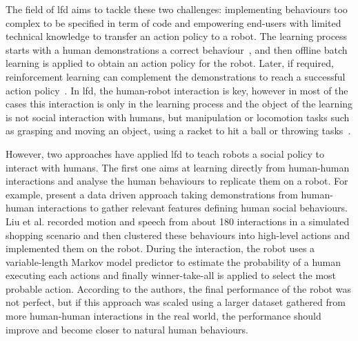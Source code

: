 	    
	The field of \gls{lfd} aims to tackle these two challenges: implementing behaviours too complex to be specified in term of code and empowering end-users with limited technical knowledge to transfer an action policy to a robot. The learning process starts with a human demonstrations a correct behaviour~\citep{argall2009survey}, and then offline batch learning is applied to obtain an action policy for the robot. Later, if required, reinforcement learning can complement the demonstrations to reach a successful action policy~\citep{billard2008robot}.
	In \gls{lfd}, the human-robot interaction is key, however in most of the cases this interaction is only in the learning process and the object of the learning is not social interaction with humans, but manipulation or locomotion tasks such as grasping and moving an object, using a racket to hit a ball or throwing tasks~\citep{billard2008robot}.
	
	However, two approaches have applied \gls{lfd} to teach robots a social policy to interact with humans.	The first one aims at learning directly from human-human interactions and analyse the human behaviours to replicate them on a robot. For example, \citet{liu2014train} present a data driven approach taking demonstrations from human-human interactions to gather relevant features defining human social behaviours. Liu et al. recorded motion and speech from about 180 interactions in a simulated shopping scenario and then clustered these behaviours into high-level actions and implemented them on the robot. During the interaction, the robot uses a variable-length Markov model predictor to estimate the probability of a human executing each actions and finally winner-take-all is applied to select the most probable action. According to the authors, the final performance of the robot was not perfect, but if this approach was scaled using a larger dataset gathered from more human-human interactions in the real world, the performance should improve and become closer to natural human behaviours.
    
